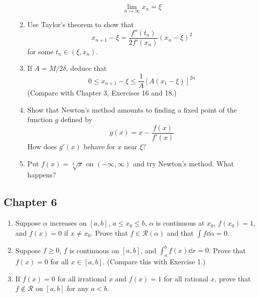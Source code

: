 \documentclass[../psets.tex]{subfiles}
\begin{document}
\begin{enumerate}[label={\textbf{\arabic*.}}]
\begin{enumerate}
        \begin{equation*}
            \lim_{n\to\infty}x_n = \xi
        \end{equation*}
        \item Use Taylor's theorem to show that
        \begin{equation*}
            x_{n+1}-\xi = \frac{f''(t_n)}{2f'(x_n)}(x_n-\xi)^2
        \end{equation*}
        for some $t_n\in(\xi,x_n)$.
        \item If $A=M/2\delta$, deduce that
        \begin{equation*}
            0 \leq x_{n+1}-\xi \leq \frac{1}{A}[A(x_1-\xi)]^{2n}
        \end{equation*}
        (Compare with Chapter 3, Exercises 16 and 18.)
        \item Show that Newton's method amounts to finding a fixed point of the function $g$ defined by
        \begin{equation*}
            g(x) = x-\frac{f(x)}{f'(x)}
        \end{equation*}
        How does $g'(x)$ behave for $x$ near $\xi$?
        \item Put $f(x)=\sqrt[3]{x}$ on $(-\infty,\infty)$ and try Newton's method. What happens?
    \end{enumerate}
\end{enumerate}


\subsection*{Chapter 6}
\begin{enumerate}[label={\textbf{\arabic*.}}]
    \item Suppose $\alpha$ increases on $[a,b]$, $a\leq x_0\leq b$, $\alpha$ is continuous at $x_0$, $f(x_0)=1$, and $f(x)=0$ if $x\neq x_0$. Prove that $f\in\mathscr{R}(\alpha)$ and that $\int f\dd{\alpha}=0$.
    \item Suppose $f\geq 0$, $f$ is continuous on $[a,b]$, and $\int_a^bf(x)\dd{x}=0$. Prove that $f(x)=0$ for all $x\in[a,b]$. (Compare this with Exercise 1.)
    \item If $f(x)=0$ for all irrational $x$ and $f(x)=1$ for all rational $x$, prove that $f\notin\mathscr{R}$ on $[a,b]$ for any $a<b$.
\end{enumerate}
\end{document}
